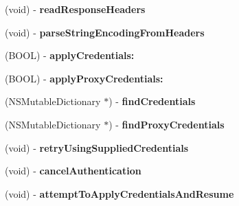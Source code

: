 \begin{DoxyCompactItemize}
\item 
\hypertarget{interface_a_s_i_h_t_t_p_request_abf63487739ee540915b40d3cace04c63}{
(void) -\/ {\bfseries read\-Response\-Headers}}
\label{interface_a_s_i_h_t_t_p_request_abf63487739ee540915b40d3cace04c63}

\item 
\hypertarget{interface_a_s_i_h_t_t_p_request_a4820891389ebf2eda587ff809b0e6bc2}{
(void) -\/ {\bfseries parse\-String\-Encoding\-From\-Headers}}
\label{interface_a_s_i_h_t_t_p_request_a4820891389ebf2eda587ff809b0e6bc2}

\item 
\hypertarget{interface_a_s_i_h_t_t_p_request_ade60b6e81c57c8ee8b616200ccb22930}{
(\-B\-O\-O\-L) -\/ {\bfseries apply\-Credentials\-:}}
\label{interface_a_s_i_h_t_t_p_request_ade60b6e81c57c8ee8b616200ccb22930}

\item 
\hypertarget{interface_a_s_i_h_t_t_p_request_a53e09e81268eb7230b4b5498ed2eb7d1}{
(\-B\-O\-O\-L) -\/ {\bfseries apply\-Proxy\-Credentials\-:}}
\label{interface_a_s_i_h_t_t_p_request_a53e09e81268eb7230b4b5498ed2eb7d1}

\item 
\hypertarget{interface_a_s_i_h_t_t_p_request_af337cbd50189506479260c6069ca2ded}{
(\-N\-S\-Mutable\-Dictionary $\ast$) -\/ {\bfseries find\-Credentials}}
\label{interface_a_s_i_h_t_t_p_request_af337cbd50189506479260c6069ca2ded}

\item 
\hypertarget{interface_a_s_i_h_t_t_p_request_aee0699cfb5ba5749a1461dfa56440121}{
(\-N\-S\-Mutable\-Dictionary $\ast$) -\/ {\bfseries find\-Proxy\-Credentials}}
\label{interface_a_s_i_h_t_t_p_request_aee0699cfb5ba5749a1461dfa56440121}

\item 
\hypertarget{interface_a_s_i_h_t_t_p_request_aad1efa3b1bc64006cc033bd0d4eee7cc}{
(void) -\/ {\bfseries retry\-Using\-Supplied\-Credentials}}
\label{interface_a_s_i_h_t_t_p_request_aad1efa3b1bc64006cc033bd0d4eee7cc}

\item 
\hypertarget{interface_a_s_i_h_t_t_p_request_a25d3d77f917c5f8b9956f6a45022dae2}{
(void) -\/ {\bfseries cancel\-Authentication}}
\label{interface_a_s_i_h_t_t_p_request_a25d3d77f917c5f8b9956f6a45022dae2}

\item 
\hypertarget{interface_a_s_i_h_t_t_p_request_ad3da0a488faf41101bbf73a8071456e8}{
(void) -\/ {\bfseries attempt\-To\-Apply\-Credentials\-And\-Resume}}
\label{interface_a_s_i_h_t_t_p_request_ad3da0a488faf41101bbf73a8071456e8}


\end{DoxyCompactItemize}
